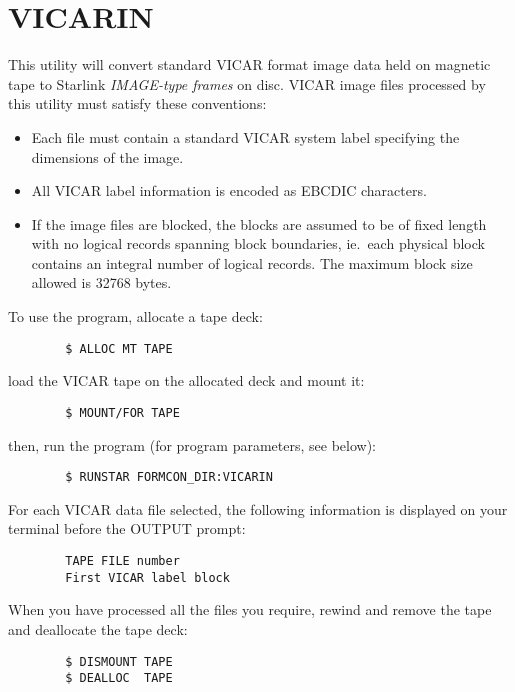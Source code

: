 \section {VICARIN}
This utility will convert standard VICAR format image data held on magnetic tape
to Starlink {\em IMAGE-type frames} on disc.
VICAR image files processed by this utility must satisfy these conventions:
\begin{itemize}
\item Each file must contain a standard VICAR system label specifying the
dimensions of the image.
\item All VICAR label information is encoded as EBCDIC characters.
\item If the image files are blocked, the blocks are assumed to be of fixed
length with no logical records spanning block boundaries, ie.\ each physical
block contains an integral number of logical records.
The maximum block size allowed is 32768 bytes.
\end{itemize}
To use the program, allocate a tape deck:
\begin{verbatim}
        $ ALLOC MT TAPE
\end{verbatim}
load the VICAR tape on the allocated deck and mount it:
\begin{verbatim}
        $ MOUNT/FOR TAPE
\end{verbatim}
then, run the program (for program parameters, see below):
\begin{verbatim}
        $ RUNSTAR FORMCON_DIR:VICARIN
\end{verbatim}
For each VICAR data file selected, the following information is displayed
on your terminal before the OUTPUT prompt:
\begin{verbatim}
        TAPE FILE number
        First VICAR label block
\end{verbatim}
When you have processed all the files you require, rewind and remove the tape
and deallocate the tape deck:
\begin{verbatim}
        $ DISMOUNT TAPE
        $ DEALLOC  TAPE
\end{verbatim}
